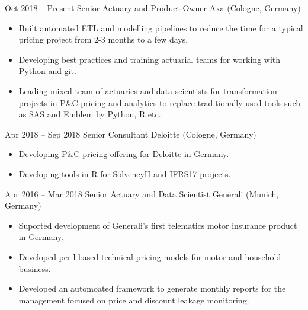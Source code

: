 \documentclass[
	a4paper,
]{fortysecondscv}
\begin{document}
\makefrontsidebar


	\begin{cvtable}[3]
		\cvitem
			{Oct 2018 -- Present}
			{Senior Actuary and Product Owner}
			{Axa (Cologne, Germany)}
			{				
				\vspace{-\topsep}
				\begin{itemize}[nosep, leftmargin=0pt] %
  					\item Built automated ETL and modelling pipelines to reduce the time for a typical pricing project from 2-3 months to a few days.
  					\item Developing best practices and training actuarial teams for working with Python and git.
  					\item Leading mixed team of actuaries and data scientists for transformation projects in P\&C pricing and analytics to replace traditionally used tools such as SAS and Emblem by Python, R etc.
				\end{itemize}
			}
		\cvitem
			{Apr 2018 -- Sep 2018}
			{Senior Consultant}
			{Deloitte (Cologne, Germany)}
			{				
				\vspace{-\topsep}
				\begin{itemize}[nosep, leftmargin=0pt] %
  					\item Developing P\&C pricing offering for Deloitte in Germany.
  					\item Developing tools in R for SolvencyII and IFRS17 projects.
				\end{itemize}
			}
		\cvitem
			{Apr 2016 -- Mar 2018}
			{Senior Actuary and Data Scientist}
			{Generali (Munich, Germany)}
			{				
				\vspace{-\topsep}
				\begin{itemize}[nosep, leftmargin=0pt] %
					\item Suported development of Generali’s first telematics motor insurance product in Germany.
					\item Developed peril based technical pricing models for motor and household business.
					\item Developed an automoated framework to generate monthly reports for the management focused on price and discount leakage monitoring.

\end{itemize}}
\end{cvtable}
\end{document}
